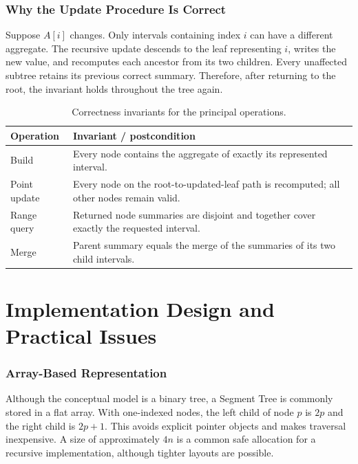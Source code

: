 \documentclass[11pt,open=any]{scrreprt}
\begin{document}
\subsection{Why the Update Procedure Is Correct}
Suppose $A[i]$ changes. Only intervals containing index $i$ can have a different aggregate. The recursive update descends to the leaf representing $i$, writes the new value, and recomputes each ancestor from its two children. Every unaffected subtree retains its previous correct summary. Therefore, after returning to the root, the invariant holds throughout the tree again.

\begin{table}[H]
\centering
\caption{Correctness invariants for the principal operations.}
\label{tab:invariants}
\begin{tabular}{p{3.2cm}p{9.1cm}}
\toprule
\textbf{Operation} & \textbf{Invariant / postcondition}\\
\midrule
Build & Every node contains the aggregate of exactly its represented interval.\\
Point update & Every node on the root-to-updated-leaf path is recomputed; all other nodes remain valid.\\
Range query & Returned node summaries are disjoint and together cover exactly the requested interval.\\
Merge & Parent summary equals the merge of the summaries of its two child intervals.\\
\bottomrule
\end{tabular}
\end{table}

\chapter{Implementation Design and Practical Issues}

\subsection{Array-Based Representation}
Although the conceptual model is a binary tree, a Segment Tree is commonly stored in a flat array. With one-indexed nodes, the left child of node $p$ is $2p$ and the right child is $2p+1$. This avoids explicit pointer objects and makes traversal inexpensive. A size of approximately $4n$ is a common safe allocation for a recursive implementation, although tighter layouts are possible.
\end{document}
